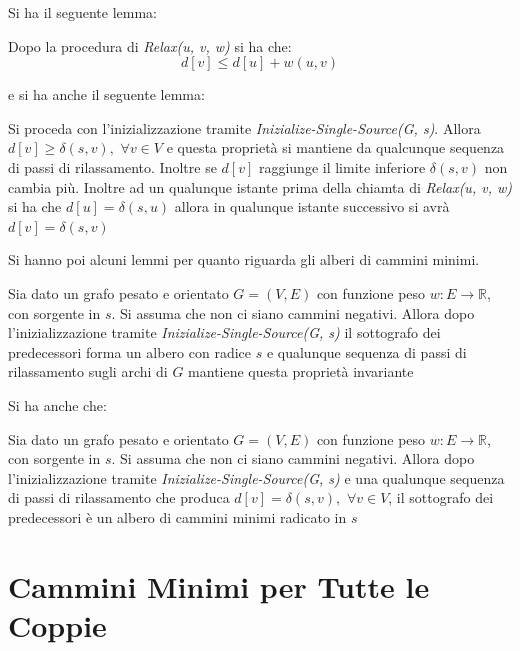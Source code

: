 \documentclass[a4paper,12pt, oneside]{book}
\begin{document}
Si ha il seguente lemma:
\begin{lemma}
  Dopo la procedura di \textit{Relax(u, v, w)} si ha che:
  \[d[v]\leq d[u]+w(u,v)\]
\end{lemma}
e si ha anche il seguente lemma:
\begin{lemma}
  Si proceda con l'inizializzazione tramite
  \textit{Inizialize-Single-Source(G, s)}. Allora $d[v]\geq
  \delta(s,v),\,\,\forall v\in V$ e questa proprietà si mantiene da
  qualcunque sequenza di passi di rilassamento. Inoltre se $d[v]$
  raggiunge il limite inferiore $\delta(s,v)$ non cambia più. Inoltre
  ad un qualunque istante prima della chiamta di \textit{Relax(u, v,
    w)} si ha che $d[u]=\delta(s, u)$ allora in qualunque istante
  successivo si avrà $d[v]=\delta(s,v)$
\end{lemma}
Si hanno poi alcuni lemmi per quanto riguarda gli alberi di cammini
minimi.
\begin{lemma}
  Sia dato un grafo pesato e orientato $G=(V,E)$ con funzione peso
  $w:E\to \mathbb{R}$, con sorgente in $s$. Si assuma che non ci siano
  cammini negativi. Allora dopo l'inizializzazione tramite
  \textit{Inizialize-Single-Source(G, s)} il sottografo dei
  predecessori forma un albero con radice $s$ e qualunque sequenza di
  passi di rilassamento sugli archi di $G$ mantiene questa proprietà
  invariante
\end{lemma}
Si ha anche che:
\begin{lemma}
  Sia dato un grafo pesato e orientato $G=(V,E)$ con funzione peso
  $w:E\to \mathbb{R}$, con sorgente in $s$. Si assuma che non ci siano
  cammini negativi. Allora dopo l'inizializzazione tramite
  \textit{Inizialize-Single-Source(G, s)} e una qualunque sequenza di
  passi di rilassamento che produca $d[v]=\delta(s,v),\,\,\forall v\in
  V$, il sottografo dei predecessori è un albero di cammini minimi
  radicato in $s$
\end{lemma}
\section{Cammini Minimi per Tutte le Coppie}
\end{document}
